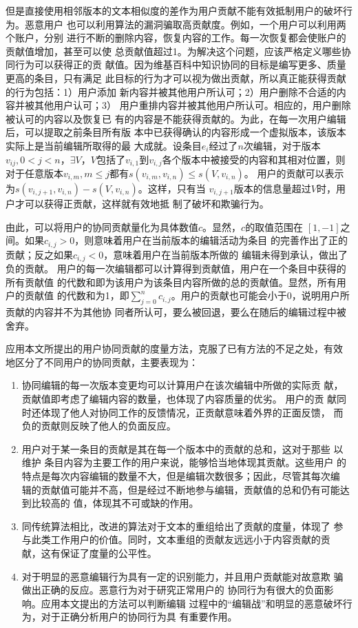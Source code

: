 但是直接使用相邻版本的文本相似度的差作为用户贡献不能有效抵制用户的破坏行为。恶意用户
也可以利用算法的漏洞骗取高贡献度。例如，一个用户可以利用两个账户，分别
进行不断的删除内容，恢复内容的工作。每一次恢复都会使账户的贡献值增加，甚至可以使
总贡献值超过1。为解决这个问题，应该严格定义哪些协同行为可以获得正的贡
献值。因为维基百科中知识协同的目标是编写更多、质量更高的条目，只有满足
此目标的行为才可以视为做出贡献，所以真正能获得贡献的行为包括：1）用户添加
新内容并被其他用户所认可；2）用户删除不合适的内容并被其他用户认可；3）
用户重排内容并被其他用户所认可。相应的，用户删除被认可的内容以及恢复已
有的内容是不能获得贡献的。为此，在每一次用户编辑后，可以提取之前条目所有版
本中已获得确认的内容形成一个虚拟版本，该版本实际上是当前编辑所取得的最
大成就。设条目$e_i$经过了$n$次编辑，对于版本$v_{ij}, 0<j<n$，$\exists
V$，$V$包括了$v_{i,1}$到$v_{i,j}$各个版本中被接受的内容和其相对位置，则
对于任意版本$v_{i,m},m \leq j$都有$s(v_{i,m},v_{i,n}) \leq s(V,v_{i,n})$。
用户的贡献可以表示为$s(v_{i,j+1},v_{i,n})-s(V,v_{i,n})$。这样，只有当
$v_{i,j+1}$版本的信息量超过$V$时，用户才可以获得正贡献，这样就有效地抵
制了破坏和欺骗行为。

由此，可以将用户的协同贡献量化为具体数值$c$。显然，$c$的取值范围在
$[1,-1]$之间。如果$c_{i,j}>0$，则意味着用户在当前版本的编辑活动为条目
的完善作出了正的贡献；反之如果$c_{i,j}<0$，意味着用户在当前版本所做的
编辑未得到承认，做出了负的贡献。
用户的每一次编辑都可以计算得到贡献值，用户在一个条目中获得的所有贡献值
的代数和即为该用户为该条目内容所做的总的贡献值。显然，所有用户的贡献值
的代数和为1，即$\sum_{j=0}^{n}c_{i,j}$。用户的贡献也可能会小于0，说明用户所贡献的内容并不为其他协
同者所认可，要么被回退，要么在随后的编辑过程中被舍弃。

应用本文所提出的用户协同贡献的度量方法，克服了已有方法的不足之处，有效
地区分了不同用户的协同贡献，主要表现为：
\begin{enumerate}
\item 协同编辑的每一次版本变更均可以计算用户在该次编辑中所做的实际贡
  献，贡献值即考虑了编辑内容的数量，也体现了内容质量的优劣。 用户的贡
  献同时还体现了他人对协同工作的反馈情况，正贡献意味着外界的正面反馈，
  而负的贡献则反映了他人的负面反应。
\item 用户对于某一条目的贡献是其在每一个版本中的贡献的总和，这对于那些
  以维护 条目内容为主要工作的用户来说，能够恰当地体现其贡献。这些用户
  的特点是每次内容编辑的数量不大，但是编辑次数很多；因此，尽管其每次编
  辑的贡献值可能并不高，但是经过不断地参与编辑，贡献值的总和仍有可能达到比较高的
  值，体现其不可或缺的作用。
\item 同传统算法相比，改进的算法对于文本的重组给出了贡献的度量，体现了
  参与此类工作用户的价值。同时，文本重组的贡献友远远小于内容贡献的贡
  献，这有保证了度量的公平性。
\item 对于明显的恶意编辑行为具有一定的识别能力，并且用户贡献能对故意欺
  骗做出正确的反应。恶意行为对于研究正常用户的
  协同行为有很大的负面影响。应用本文提出的方法可以判断编辑
  过程中的“编辑战”和明显的恶意破坏行为，对于正确分析用户的协同行为具
  有重要作用。
\end{enumerate}
 
